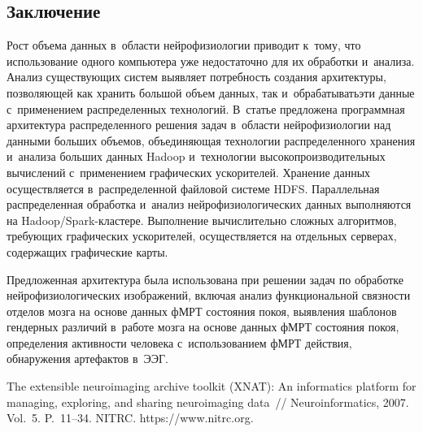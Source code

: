 \begin{multicols}{2}
\section{Заключение}

    Рост объема данных в~области нейрофизиологии приводит к~тому, что 
использование одного компьютера уже недостаточно для их обработки 
и~анализа. Анализ существующих систем выявляет потребность создания 
архитектуры, позволяющей как хранить большой объем данных, так 
и~обрабатывать\linebreak эти данные с~применением распределенных технологий. 
В~статье предложена про\-грам\-мная архитектура распределенного решения 
задач в~области нейрофизиологии над данными больших объемов, 
\mbox{объединяющая} технологии распределенного хранения и~анализа больших 
данных Hadoop и~технологии высокопроизводительных вычислений 
с~применением графических ускорителей. Хранение данных осуществляется 
в~распределенной файловой системе HDFS. Параллельная распределенная 
обработка и~анализ нейрофизиологических данных выполняются на 
Hadoop/Spark-клас\-те\-ре. Выполнение вычислительно сложных алгоритмов, 
требующих графических ускорителей, осуществляется на отдельных 
серверах, содержащих графические карты.
    
    Предложенная архитектура была использована при решении задач по 
обработке нейрофизиологических изображений, включая анализ 
функциональной связности отделов мозга на основе данных фМРТ состояния 
покоя, выявления шаблонов гендерных различий в~работе мозга на основе 
данных фМРТ состояния покоя, определения активности человека 
с~использованием фМРТ действия, обнаружения артефактов в~ЭЭГ.
    
{\small\frenchspacing
{%
\begin{thebibliography}{99}
   The extensible neuroimaging 
archive toolkit (XNAT): An informatics platform for managing, exploring, and sharing 
neuroimaging data~// Neuroinformatics, 2007. Vol.~5. P.~11--34.
  NITRC. {\sf https://www.nitrc.org}.
  

\end{thebibliography}}}
\end{multicols}
